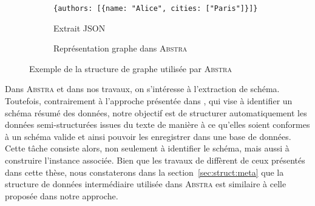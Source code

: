 \begin{figure}[htb]
    \centering
    \begin{subfigure}{.6\linewidth}
        \centering
        \begin{adjustbox}{max width=\linewidth}
            \verb|{authors: [{name: "Alice", cities: ["Paris"]}]}|
        \end{adjustbox}
        \caption{Extrait JSON}
    \end{subfigure}
    \begin{subfigure}{.6\linewidth}
        \centering
        \begin{adjustbox}{max width=\linewidth}
        \end{adjustbox}
        \caption{Représentation graphe dans \textsc{Abstra}}
    \end{subfigure}
    \caption[Exemple de la structure de graphe utilisée par \textsc{Abstra}]{Exemple de la structure de graphe utilisée par \textsc{Abstra} \cite{barretAbstraGenericAbstractions2022}}
    \label{fig:struct:abstra-ex}
\end{figure}

Dans \textsc{Abstra} et dans nos travaux, on s'intéresse à l'extraction de schéma.
Toutefois, contrairement à l'approche présentée dans \cite{barretAbstraGenericAbstractions2022}, qui vise à identifier un schéma résumé des données, notre objectif est de structurer automatiquement les données semi-structurées issues du texte de manière à ce qu'elles soient conformes à un schéma valide et ainsi pouvoir les enregistrer dans une base de données.
Cette tâche consiste alors, non seulement à identifier le schéma, mais aussi à construire l'instance associée.
Bien que les travaux de \cite{barretAbstraGenericAbstractions2022} diffèrent de ceux présentés dans cette thèse, nous constaterons dans la section~\ref{sec:struct:meta} que la structure de données intermédiaire utilisée dans \textsc{Abstra} est similaire à celle proposée dans notre approche.
